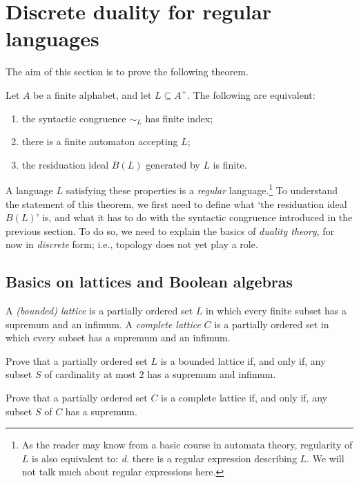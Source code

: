 \section{Discrete duality for regular languages}
The aim of this section is to prove the following theorem.
\begin{theoremstar}
  Let $A$ be a finite alphabet, and let $L \subseteq A^+$. The following are equivalent:
\begin{enumerate}
  \item the syntactic congruence $\sim_L$ has finite index;
  \item there is a finite automaton accepting $L$;  
  \item the residuation ideal $B(L)$ generated by $L$ is finite.
  \end{enumerate}
\end{theoremstar}
A language $L$ satisfying these properties is a \emph{regular} language.\footnote{As the reader may know from a basic course in automata theory, regularity of $L$ is also equivalent to: \emph{d.} there is a regular expression describing $L$. We will not talk much about regular expressions here.} %
To understand the statement of this theorem, we first need to define what `the residuation ideal $B(L)$' is, and what it has to do with the syntactic congruence introduced in the previous section. To do so, we need to explain the basics of \emph{duality theory}, for now in \emph{discrete} form; i.e., topology does not yet play a role.

\subsection*{Basics on lattices and Boolean algebras}
\begin{definition}
  A \emph{(bounded) lattice} is a partially ordered set $L$ in which every finite subset has a supremum and an infimum.
  A \emph{complete lattice} $C$ is a partially ordered set in which every subset has a supremum and an infimum.
\end{definition}

\begin{exercise}\easy
  Prove that a partially ordered set $L$ is a bounded lattice if, and only if, any subset $S$ of cardinality at most $2$ has a supremum and infimum.

  Prove that a partially ordered set $C$ is a complete lattice if, and only if, any subset $S$ of $C$ has a supremum.
\end{exercise}

